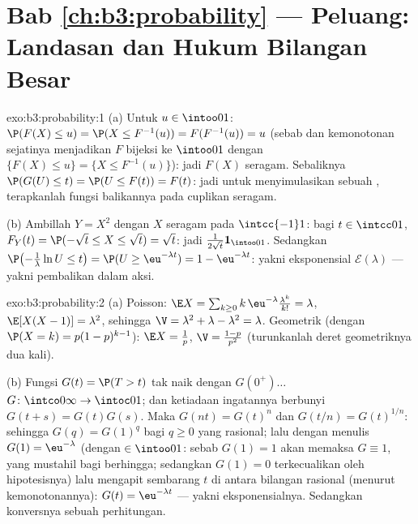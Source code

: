 \section*{Bab \ref{ch:b3:probability} --- Peluang:
Landasan dan Hukum Bilangan Besar}

\begin{solution}{exo:b3:probability:1}
(a) Untuk $u \in \intoo01$: $\P(F(X) \leq u) = \P(X \leq
F^{-1}(u)) = F(F^{-1}(u)) = u$ (sebab  dan kemonotonan
sejatinya menjadikan $F$ bijeksi ke $\intoo01$ dengan
$\{F(X) \leq u\} = \{X \leq F^{-1}(u)\}$): jadi $F(X)$ seragam.
Sebaliknya $\P(G(U) \leq t) = \P(U \leq F(t)) = F(t)$: jadi untuk
menyimulasikan sebuah , terapkanlah fungsi  balikannya pada
cuplikan seragam.

(b) Ambillah $Y = X^2$ dengan $X$ seragam pada $\intcc{-1}1$: bagi $t \in
\intcc01$, $F_Y(t) = \P(-\sqrt t \leq X \leq \sqrt t) = \sqrt
t$: jadi  $\frac1{2\sqrt t}\mathbf 1_{\intoo01}$. Sedangkan
$\P\bigl(-\frac1\lambda\ln U \leq t\bigr) = \P(U \geq
\eu^{-\lambda t}) = 1 - \eu^{-\lambda t}$: yakni eksponensial
$\mathcal E(\lambda)$ --- yakni pembalikan dalam aksi.
\end{solution}

\begin{solution}{exo:b3:probability:2}
(a) Poisson: $\E X = \sum_{k\geq0}k\,\eu^{-\lambda}
\frac{\lambda^k}{k!} = \lambda$, $\E[X(X-1)] = \lambda^2$, sehingga
$\V = \lambda^2 + \lambda - \lambda^2 = \lambda$. Geometrik
(dengan $\P(X = k) = p(1-p)^{k-1}$): $\E X = \frac1p$, $\V =
\frac{1-p}{p^2}$ (turunkanlah deret geometriknya dua kali).

(b) Fungsi $G(t) = \P(T > t)$ tak naik dengan $G(0^+)\dots$
$G \colon \intco0\infty \to \intoc01$; dan ketiadaan ingatannya berbunyi
$G(t + s) = G(t)G(s)$. Maka $G(n t) = G(t)^n$ dan $G(t/n) =
G(t)^{1/n}$: sehingga $G(q) = G(1)^q$ bagi $q \geq 0$ yang rasional; lalu dengan menulis
$G(1) = \eu^{-\lambda}$ (dengan $\in \intoo01$: sebab $G(1) = 1$ akan
memaksa $G \equiv 1$, yang mustahil bagi  berhingga;
sedangkan $G(1) = 0$ terkecualikan oleh hipotesisnya) lalu mengapit
sembarang $t$ di antara bilangan rasional (menurut kemonotonannya): $G(t) =
\eu^{-\lambda t}$ --- yakni  eksponensialnya. Sedangkan konversnya sebuah
perhitungan.
\end{solution}

